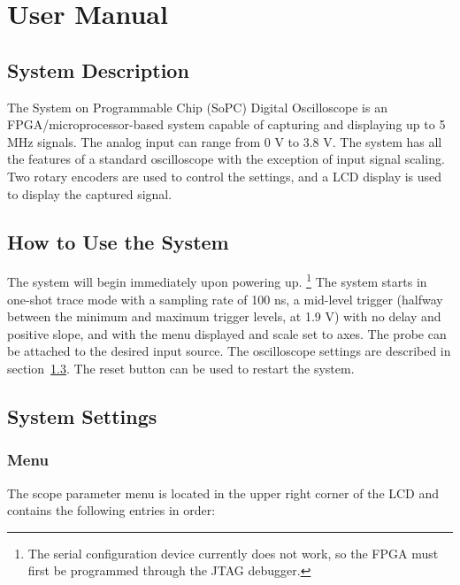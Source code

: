 \documentclass[12pt]{refart} %
\begin{document}
\tableofcontents

\newpage 
\section{User Manual} %
\begin{comment}
	How to use system (how it works or as if it worked) 
Non-technical, written for user
"screen" shots are useful - display output pics 
Keypad layout (switch) - also on pcb 
Usually ~10 pages 
\end{comment}
\subsection{System Description}
The System on Programmable Chip (SoPC) Digital Oscilloscope is an FPGA/microprocessor-based system capable of capturing and displaying up to 5 MHz signals. The analog input can range from 0 V to 3.8 V. The system has all the features of a standard oscilloscope with the exception of input signal scaling. Two rotary encoders are used to control the settings, and a LCD display is used to display the captured signal.  

\subsection{How to Use the System} 
The system will begin immediately upon powering up. \footnote{The serial configuration device currently does not work, so the FPGA must first be programmed through the JTAG debugger.} The system starts in one-shot trace mode with a sampling rate of 100 ns, a mid-level trigger (halfway between the minimum and maximum trigger levels, at  1.9 V) with no delay and positive slope, and with the menu displayed and scale set to axes. %
The probe can be attached to the desired input source. The oscilloscope settings are described in section~\ref{subsec:SystemSettings}. The reset button can be used to restart the system. 

\subsection{System Settings}\label{subsec:SystemSettings}

\subsubsection{Menu}
The scope parameter menu is located in the upper right corner of the LCD and contains the following entries in order:
\end{document}
